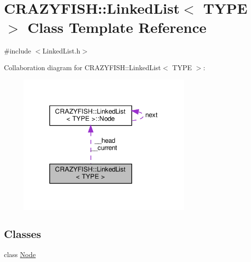 \hypertarget{classCRAZYFISH_1_1LinkedList}{}\section{C\+R\+A\+Z\+Y\+F\+I\+SH\+:\+:Linked\+List$<$ T\+Y\+PE $>$ Class Template Reference}
\label{classCRAZYFISH_1_1LinkedList}


{\ttfamily \#include $<$Linked\+List.\+h$>$}



Collaboration diagram for C\+R\+A\+Z\+Y\+F\+I\+SH\+:\+:Linked\+List$<$ T\+Y\+PE $>$\+:\nopagebreak
\begin{figure}[H]
\begin{center}
\leavevmode
\includegraphics[width=245pt]{classCRAZYFISH_1_1LinkedList__coll__graph}
\end{center}
\end{figure}
\subsection*{Classes}
\begin{DoxyCompactItemize}
\item 
class \hyperlink{classCRAZYFISH_1_1LinkedList_1_1Node}{Node}
\end{DoxyCompactItemize}
